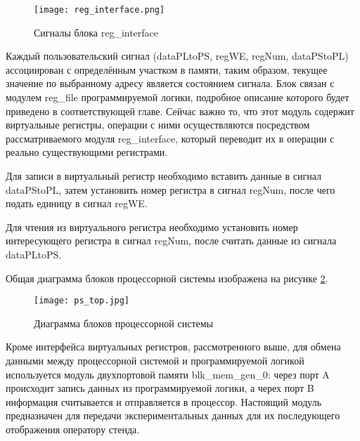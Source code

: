 \begin{figure}[ht]
    \centering
    \texttt{[image: reg\_interface.png]}
    \caption{Сигналы блока reg\_interface}
    \label{fig:reg_interface}
\end{figure}
Каждый пользовательский сигнал (dataPLtoPS, regWE, regNum, dataPStoPL) ассоциирован с определённым участком в памяти, таким образом, текущее значение по выбранному адресу является состоянием сигнала. Блок связан с модулем reg\_file программируемой логики, подробное описание которого будет приведено в соответствующей главе. Сейчас важно то, что этот модуль содержит виртуальные регистры, операции с ними осуществляются посредством рассматриваемого модуля reg\_interface, который переводит их в операции с реально существующими регистрами.\par
Для записи в виртуальный регистр необходимо вставить данные в сигнал dataPStoPL, затем установить номер регистра в сигнал regNum, после чего подать единицу в сигнал regWE.\par
Для чтения из виртуального регистра необходимо установить номер интересующего регистра в сигнал regNum, после считать данные из сигнала dataPLtoPS.\par
Общая диаграмма блоков процессорной системы изображена на рисунке \ref{fig:ps_top}.\par
\begin{figure}[ht]
    \centering
    \texttt{[image: ps\_top.jpg]}
    \caption{Диаграмма блоков процессорной системы}
    \label{fig:ps_top}
\end{figure}
Кроме интерфейса виртуальных регистров, рассмотренного выше, для обмена данными между процессорной системой и программируемой логикой используется модуль двухпортовой памяти blk\_mem\_gen\_0: через порт A происходит запись данных из программируемой логики, а черех порт B информация считывается и отправляется в процессор. Настоящий модуль предназначен для передачи экспериментальных данных для их последующего отображения оператору стенда.\par
